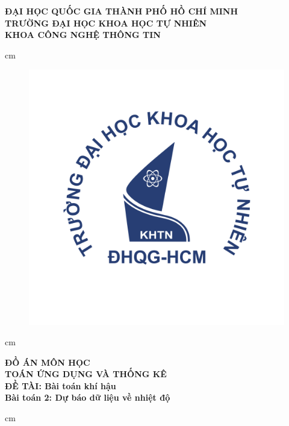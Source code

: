 \documentclass[a4paper]{article}
\author{Nguyễn Văn Lộc}
\begin{document}
\fancyhf{}
\chead{}
\cfoot{\thepage}
\rfoot{}
\lfoot{}
\pagestyle{fancy}
\begin{titlepage}
\begin{mybox}
\begin{center}
\fontsize{12}{12}\selectfont
\textbf{ĐẠI HỌC QUỐC GIA THÀNH PHỐ HỒ CHÍ MINH}\\
\textbf{TRƯỜNG ĐẠI HỌC KHOA HỌC TỰ NHIÊN}\\
\textbf{KHOA CÔNG NGHỆ THÔNG TIN}
\end{center}
 cm
\begin{figure}[H]
\begin{center}
\includegraphics[scale=0.25]{images/logo}
\end{center}
\end{figure}
 cm
\begin{center}
\fontsize{18}{14}\selectfont
\textbf{ĐỒ ÁN MÔN HỌC}\\
\fontsize{26}{16}\selectfont
\textbf{TOÁN ỨNG DỤNG VÀ THỐNG KÊ}\\
\fontsize{18}{12}\selectfont
\textbf{ĐỀ TÀI: Bài toán khí hậu}\\
\textbf{Bài toán 2: Dự báo dữ liệu về nhiệt độ}
\end{center}
 cm
\fontsize{14}{12}\selectfont

\end{mybox}
\end{titlepage}
\end{document}
